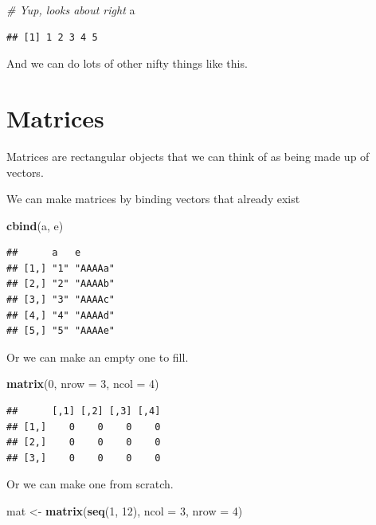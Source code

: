 \documentclass[
]{book}
\newenvironment{Shaded}{\begin{snugshade}}{\end{snugshade}}
\newcommand{\CommentTok}[1]{\textcolor[rgb]{0.56,0.35,0.01}{\textit{#1}}}
\newcommand{\DataTypeTok}[1]{\textcolor[rgb]{0.13,0.29,0.53}{#1}}
\newcommand{\DecValTok}[1]{\textcolor[rgb]{0.00,0.00,0.81}{#1}}
\newcommand{\KeywordTok}[1]{\textcolor[rgb]{0.13,0.29,0.53}{\textbf{#1}}}
\newcommand{\NormalTok}[1]{#1}
\newcommand{\StringTok}[1]{\textcolor[rgb]{0.31,0.60,0.02}{#1}}
\begin{document}
\begin{Shaded}
\begin{Highlighting}[]
\CommentTok{# Yup, looks about right}
\NormalTok{a}
\end{Highlighting}
\end{Shaded}

\begin{verbatim}
## [1] 1 2 3 4 5
\end{verbatim}

And we can do lots of other nifty things like this.

\hypertarget{matrices}{%
\section{Matrices}\label{matrices}}

Matrices are rectangular objects that we can think of as being made up of vectors.

We can make matrices by binding vectors that already exist

\begin{Shaded}
\begin{Highlighting}[]
\KeywordTok{cbind}\NormalTok{(a, e)}
\end{Highlighting}
\end{Shaded}

\begin{verbatim}
##      a   e      
## [1,] "1" "AAAAa"
## [2,] "2" "AAAAb"
## [3,] "3" "AAAAc"
## [4,] "4" "AAAAd"
## [5,] "5" "AAAAe"
\end{verbatim}

Or we can make an empty one to fill.

\begin{Shaded}
\begin{Highlighting}[]
\KeywordTok{matrix}\NormalTok{(}\DecValTok{0}\NormalTok{, }\DataTypeTok{nrow =} \DecValTok{3}\NormalTok{, }\DataTypeTok{ncol =} \DecValTok{4}\NormalTok{)}
\end{Highlighting}
\end{Shaded}

\begin{verbatim}
##      [,1] [,2] [,3] [,4]
## [1,]    0    0    0    0
## [2,]    0    0    0    0
## [3,]    0    0    0    0
\end{verbatim}

Or we can make one from scratch.

\begin{Shaded}
\begin{Highlighting}[]
\NormalTok{mat <-}\StringTok{ }\KeywordTok{matrix}\NormalTok{(}\KeywordTok{seq}\NormalTok{(}\DecValTok{1}\NormalTok{, }\DecValTok{12}\NormalTok{), }\DataTypeTok{ncol =} \DecValTok{3}\NormalTok{, }\DataTypeTok{nrow =} \DecValTok{4}\NormalTok{)}
\end{Highlighting}
\end{Shaded}
\end{document}
